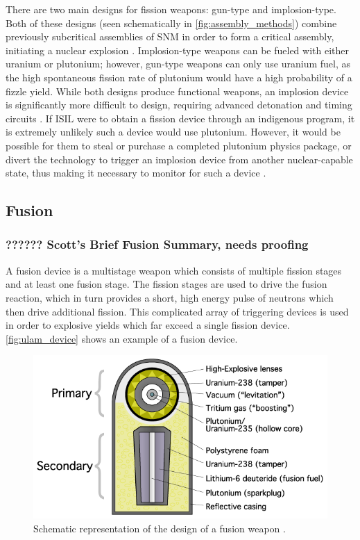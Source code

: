 \documentclass{report}
\begin{document}
There are two main designs for fission weapons:  gun-type and  implosion-type. Both of these designs (seen schematically in \autoref{fig:assembly_methods}) combine previously subcritical assemblies of SNM in order to form a critical assembly, initiating a nuclear explosion \cite{Serber1992}. Implosion-type weapons can be fueled with either uranium or plutonium; however,  gun-type weapons can only use uranium fuel, as the high spontaneous fission rate of  plutonium would have a high probability of a fizzle yield. While both designs produce functional weapons, an implosion device is significantly more difficult to design, requiring advanced detonation and timing circuits \cite{Serber1992}. If ISIL were to obtain a fission device through an indigenous program, it is extremely unlikely such a device would use plutonium. However, it would be possible for them to steal or purchase a completed plutonium physics package, or divert the technology to trigger an implosion device from another nuclear-capable state, thus making it necessary to monitor for such a device \cite{Moody2014}.








\subsection{Fusion}


\subsubsection{?????? Scott's Brief Fusion Summary, needs  proofing}

A fusion device is a multistage weapon which consists of multiple fission stages and at least one fusion stage. The fission stages are used to drive the fusion reaction, which in turn provides a short, high energy pulse of neutrons which then drive additional fission. This complicated array of triggering devices is used in order to explosive yields which far exceed a single fission device. \autoref{fig:ulam_device} shows an example of a fusion device.

\begin{figure}[h]
  \centering
  \includegraphics[scale=0.45]{./figures/Ulam_device.png}
  \caption{Schematic representation of the design of a fusion weapon \cite{WikimediaCommons2005}.}
  \label{fig:ulam_device}
\end{figure}
\end{document}
